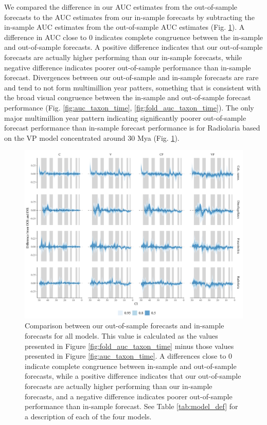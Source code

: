 \documentclass[12pt,letterpaper]{article}
\begin{document}
\begin{refsection}
We compared the difference in our AUC estimates from the out-of-sample forecasts to the AUC estimates from our in-sample forecasts by subtracting the in-sample AUC estimates from the out-of-sample AUC estimates (Fig. \ref{fig:oos_ins_diff}). A difference in AUC close to 0 indicates complete congruence between the in-sample and out-of-sample forecasts. A positive difference indicates that our out-of-sample forecasts are actually higher performing than our in-sample forecasts, while negative difference indicates poorer out-of-sample performance than in-sample forecast. Divergences between our out-of-sample and in-sample forecasts are rare and tend to not form multimillion year patters, something that is consistent with the broad visual congruence between the in-sample and out-of-sample forecast performance (Fig. \ref{fig:auc_taxon_time}, \ref{fig:fold_auc_taxon_time}). The only major multimillion year pattern indicating significantly poorer out-of-sample forecast performance than in-sample forecast performance is for Radiolaria based on the VP model concentrated around 30 Mya (Fig. \ref{fig:oos_ins_diff}).

\begin{figure}[ht]
 \centering
 \includegraphics[width=\textwidth,height=0.5\textheight,keepaspectratio=true]{../results/figure/auc_diff}
 \caption{Comparison between our out-of-sample forecasts and in-sample forecasts for all models. This value is calculated as the values presented in Figure \ref{fig:fold_auc_taxon_time} minus those values presented in Figure \ref{fig:auc_taxon_time}. A differences close to 0 indicate complete congruence between in-sample and out-of-sample forecasts, while a positive difference indicates that our out-of-sample forecasts are actually higher performing than our in-sample forecasts, and a negative difference indicates poorer out-of-sample performance than in-sample forecast. See Table \ref{tab:model_def} for a description of each of the four models.}
 \label{fig:oos_ins_diff}
\end{figure}




\end{refsection}
\end{document}
